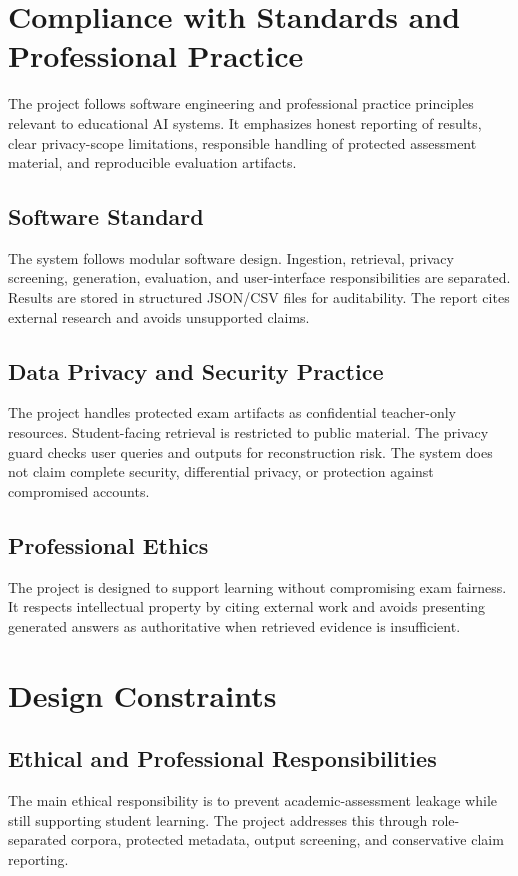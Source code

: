 \section{Compliance with Standards and Professional Practice}

The project follows software engineering and professional practice principles relevant to educational AI systems. It emphasizes honest reporting of results, clear privacy-scope limitations, responsible handling of protected assessment material, and reproducible evaluation artifacts.

\subsection{Software Standard}
The system follows modular software design. Ingestion, retrieval, privacy screening, generation, evaluation, and user-interface responsibilities are separated. Results are stored in structured JSON/CSV files for auditability. The report cites external research and avoids unsupported claims.

\subsection{Data Privacy and Security Practice}
The project handles protected exam artifacts as confidential teacher-only resources. Student-facing retrieval is restricted to public material. The privacy guard checks user queries and outputs for reconstruction risk. The system does not claim complete security, differential privacy, or protection against compromised accounts.

\subsection{Professional Ethics}
The project is designed to support learning without compromising exam fairness. It respects intellectual property by citing external work and avoids presenting generated answers as authoritative when retrieved evidence is insufficient.

\section{Design Constraints}

\subsection{Ethical and Professional Responsibilities}
The main ethical responsibility is to prevent academic-assessment leakage while still supporting student learning. The project addresses this through role-separated corpora, protected metadata, output screening, and conservative claim reporting.

